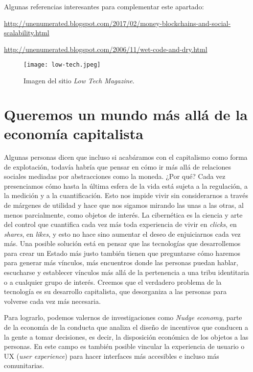 Algunas referencias interesantes para complementar este apartado:

\url{http://unenumerated.blogspot.com/2017/02/money-blockchains-and-social-scalability.html}

\url{http://unenumerated.blogspot.com/2006/11/wet-code-and-dry.html}

\begin{figure}[htbp]
	\centering
	\texttt{[image: low-tech.jpeg]}
	\caption[\emph{Low Tech Magazine}]{Imagen del sitio \emph{Low Tech Magazine}.}
	\label{fig:lowtech}
\end{figure}

\section{Queremos un mundo más allá de la economía capitalista}
\label{sec:mundo}

Algunas personas dicen que incluso si acabáramos con el capitalismo como forma de explotación, todavía habría que pensar en cómo ir más allá de relaciones sociales mediadas por abstracciones como la moneda. ¿Por qué? Cada vez presenciamos cómo hasta la última esfera de la vida está sujeta a la regulación, a la medición y a la cuantificación. Esto nos impide vivir sin considerarnos a través de márgenes de utilidad y hace que nos sigamos mirando las unas a las otras, al menos parcialmente, como objetos de interés. La cibernética es la ciencia y arte del control que cuantifica cada vez más toda experiencia de vivir en \emph{clicks}, en \emph{shares}, en \emph{likes}, y esto no hace sino aumentar el deseo de enjuiciarnos cada vez más. Una posible solución está en pensar que las tecnologías que desarrollemos para crear un Estado más justo también tienen que preguntarse cómo haremos para generar más vínculos, más encuentros donde las personas puedan hablar, escucharse y establecer vínculos más allá de la pertenencia a una tribu identitaria o a cualquier grupo de interés. Creemos que el verdadero problema de la tecnología es su desarrollo capitalista, que desorganiza a las personas para volverse cada vez más necesaria.

Para lograrlo, podemos valernos de investigaciones como \emph{Nudge economy}, parte de la economía de la conducta que analiza el diseño de incentivos que conducen a la gente a tomar decisiones, es decir, la disposición económica de los objetos a las personas. En este campo es también posible vincular la experiencia de usuario o UX (\emph{user experience}) para hacer interfaces más accesibles e incluso más comunitarias.

